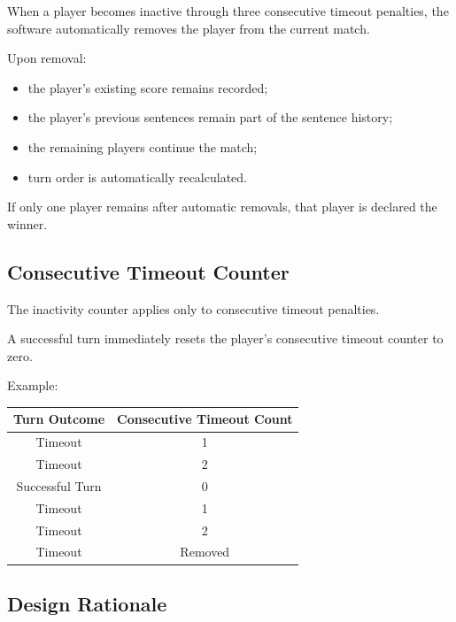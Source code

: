 \documentclass[11pt,a4paper]{article}
\begin{document}
When a player becomes inactive through three consecutive timeout penalties, the software automatically removes the player from the current match.

Upon removal:

\begin{itemize}
    \item the player's existing score remains recorded;
    \item the player's previous sentences remain part of the sentence history;
    \item the remaining players continue the match;
    \item turn order is automatically recalculated.
\end{itemize}

If only one player remains after automatic removals, that player is declared the winner.


\subsection{Consecutive Timeout Counter}

The inactivity counter applies only to consecutive timeout penalties.

A successful turn immediately resets the player's consecutive timeout counter to zero.

Example:

\begin{center}
\begin{tabular}{c c}
\toprule
Turn Outcome & Consecutive Timeout Count\\
\midrule
Timeout & 1\\
Timeout & 2\\
Successful Turn & 0\\
Timeout & 1\\
Timeout & 2\\
Timeout & Removed\\
\bottomrule
\end{tabular}
\end{center}


\subsection{Design Rationale}
\end{document}
